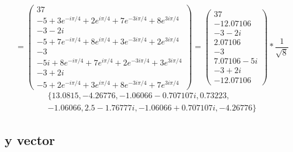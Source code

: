 \documentclass{article}
\begin{document}
\[
	=
	\begin{pmatrix}
	    37 \\
		-5         + 3 e^{-i \pi/4} + 2 e^{i \pi/4}  + 7 e^{-3 i \pi/4} + 8 e^{ 3 i \pi/4} \\
		-3 - 2i \\
		-5         + 7 e^{-i \pi/4} + 8 e^{ i \pi/4} + 3 e^{-3 i \pi/4} + 2 e^{ 3 i \pi/4} \\
		-3 \\
		-5 i       + 8 e^{-i \pi/4} + 7 e^{ i \pi/4} + 2 e^{-3 i \pi/4} + 3 e^{ 3 i \pi/4} \\
		-3         + 2i \\
		-5         + 2 e^{-i \pi/4} + 3 e^{ i \pi/4} + 8 e^{-3 i \pi/4} + 7 e^{ 3 i \pi/4}

	\end{pmatrix}
	=
	\begin{pmatrix}
		37 \\
		-12.07106 \\
		-3 -2i \\
		2.07106 \\
		-3 \\
		7.07106 - 5 i \\
		-3 + 2i \\
		-12.07106
	\end{pmatrix}
	*
   \frac{1}{\sqrt{8}} 
\]
\begin{align*}
  \{13.0815, -4.26776, -1.06066-0.707107 i, 0.73223,\\
  -1.06066, 2.5-1.76777 i, -1.06066+0.707107 i, -4.26776\}
\end{align*}


\subsection{y vector}
\end{document}
